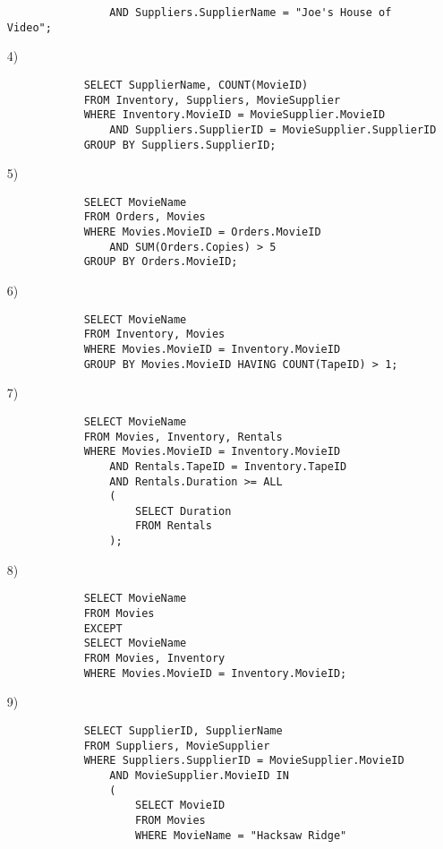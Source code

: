 \documentclass[10pt,a4paper]{article}
\begin{document}
\begin{enumerate}
\begin{verbatim}
                AND Suppliers.SupplierName = "Joe's House of Video";
        \end{verbatim}
        \item[4)]\begin{verbatim}
            SELECT SupplierName, COUNT(MovieID)
            FROM Inventory, Suppliers, MovieSupplier
            WHERE Inventory.MovieID = MovieSupplier.MovieID
                AND Suppliers.SupplierID = MovieSupplier.SupplierID
            GROUP BY Suppliers.SupplierID;
        \end{verbatim}
        \item[5)]\begin{verbatim}
            SELECT MovieName
            FROM Orders, Movies
            WHERE Movies.MovieID = Orders.MovieID
                AND SUM(Orders.Copies) > 5
            GROUP BY Orders.MovieID;
        \end{verbatim}
        \item[6)]\begin{verbatim}
            SELECT MovieName
            FROM Inventory, Movies
            WHERE Movies.MovieID = Inventory.MovieID
            GROUP BY Movies.MovieID HAVING COUNT(TapeID) > 1;
        \end{verbatim}
        \item[7)]\begin{verbatim}
            SELECT MovieName
            FROM Movies, Inventory, Rentals
            WHERE Movies.MovieID = Inventory.MovieID
                AND Rentals.TapeID = Inventory.TapeID
                AND Rentals.Duration >= ALL 
                (
                    SELECT Duration
                    FROM Rentals
                );
        \end{verbatim}
        \item[8)]\begin{verbatim}
            SELECT MovieName
            FROM Movies
            EXCEPT
            SELECT MovieName
            FROM Movies, Inventory
            WHERE Movies.MovieID = Inventory.MovieID;
        \end{verbatim}
        \item[9)]\begin{verbatim}
            SELECT SupplierID, SupplierName
            FROM Suppliers, MovieSupplier
            WHERE Suppliers.SupplierID = MovieSupplier.MovieID
                AND MovieSupplier.MovieID IN
                (
                    SELECT MovieID
                    FROM Movies
                    WHERE MovieName = "Hacksaw Ridge"

\end{verbatim}
\end{enumerate}
\end{document}

